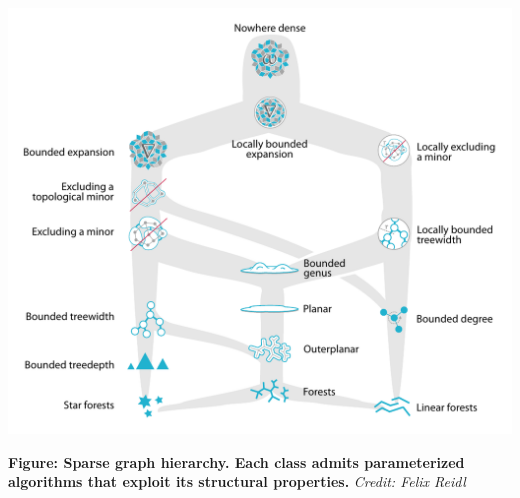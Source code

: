 \begin{center}
	\includegraphics[width=\linewidth]{images/sparse_classes.pdf}
\end{center}
\begin{center}
	\small
	\textbf{Figure:  Sparse graph hierarchy.  Each class admits parameterized algorithms that exploit its structural properties.} \textit{Credit: Felix Reidl}
\end{center}
